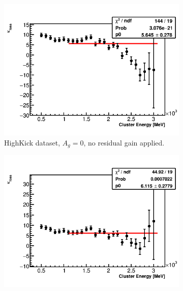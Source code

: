 \begin{landscape}
\begin{figure}[h]
\centering
    \begin{subfigure}[t]{0.34\textwidth}
        \centering
        \includegraphics[width=\textwidth]{TMethod_kappa_loss_Vs_EBin_Canv_HK-0}
        \caption{HighKick dataset, $A_{g} = 0$, no residual gain applied.}
    \end{subfigure}%
    \hspace{1cm}
    \begin{subfigure}[t]{0.34\textwidth}
        \centering
        \includegraphics[width=\textwidth]{TMethod_kappa_loss_Vs_EBin_Canv_HK-5p1}

\end{subfigure}
\end{figure}
\end{landscape}
